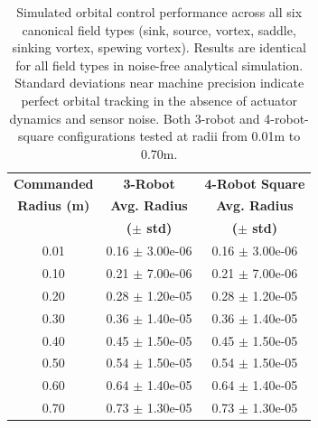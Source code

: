 \begin{table}[h]
    \centering
    \begin{tabular}{ccc}
    \hline
    \textbf{Commanded} & \textbf{3-Robot} & \textbf{4-Robot Square} \\
    \textbf{Radius (m)} & \textbf{Avg. Radius} & \textbf{Avg. Radius} \\
     & \textbf{($\pm$ std)} & \textbf{($\pm$ std)} \\
    \hline
    0.01 & 0.16 $\pm$ 3.00e-06 & 0.16 $\pm$ 3.00e-06 \\
    0.10 & 0.21 $\pm$ 7.00e-06 & 0.21 $\pm$ 7.00e-06 \\
    0.20 & 0.28 $\pm$ 1.20e-05 & 0.28 $\pm$ 1.20e-05 \\
    0.30 & 0.36 $\pm$ 1.40e-05 & 0.36 $\pm$ 1.40e-05 \\
    0.40 & 0.45 $\pm$ 1.50e-05 & 0.45 $\pm$ 1.50e-05 \\
    0.50 & 0.54 $\pm$ 1.50e-05 & 0.54 $\pm$ 1.50e-05 \\
    0.60 & 0.64 $\pm$ 1.40e-05 & 0.64 $\pm$ 1.40e-05 \\
    0.70 & 0.73 $\pm$ 1.30e-05 & 0.73 $\pm$ 1.30e-05 \\
    \hline
    \end{tabular}
    \caption{Simulated orbital control performance across all six canonical field types (sink, source, vortex, saddle, sinking vortex, spewing vortex). Results are identical for all field types in noise-free analytical simulation. Standard deviations near machine precision indicate perfect orbital tracking in the absence of actuator dynamics and sensor noise. Both 3-robot and 4-robot-square configurations tested at radii from 0.01m to 0.70m.}
    \label{tab:simulation_orbital_results}
    \end{table}
